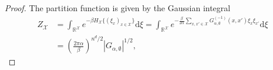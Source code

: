 \documentclass[a4paper,11pt]{article}
\theoremstyle{plain}
\theoremstyle{definition}
\begin{document}
\begin{proof}%
  The partition function is given by the Gaussian integral
  \begin{align*}
    Z_\mathcal{X}
    &=\int_{\mathbb{R}^\mathcal{X}}
    e^{-\beta H_\mathcal{X}\{(\xi_x)_{x\in\mathcal{X}}\}}\mathrm{d}\xi
    =\int_{\mathbb{R}^\mathcal{X}}
    e^{-\frac{\beta}{2\alpha} \sum_{x,x'\in\mathcal{X}}
      G^{(-1)}_{\alpha,\emptyset}(x,x')\xi_x\xi_{x'}}\mathrm{d}\xi\\
    &=\left(\frac{2\pi\alpha}{\beta}\right)^{n^d/2}
    |G_{\alpha,\emptyset}|^{1/2},
  \end{align*}

\end{proof}
\end{document}
